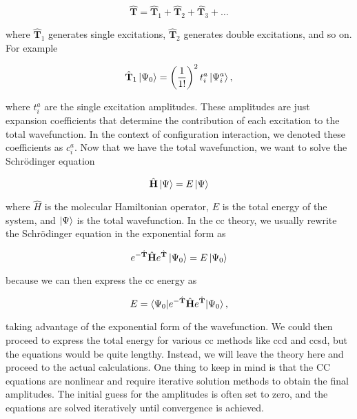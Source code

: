 \begin{equation}
\hat{\mathbf{T}}=\hat{\mathbf{T}}_1+\hat{\mathbf{T}}_2+\hat{\mathbf{T}}_3+\dots
\end{equation}

where \(\hat{\mathbf{T}}_1\) generates single excitations, \(\hat{\mathbf{T}}_2\) generates double excitations, and so on. For example

\begin{equation}
\hat{\mathbf{T}}_1\ket{\Psi_0}=\left(\frac{1}{1!}\right)^2t_i^a\ket{\Psi_i^a},
\end{equation}

where \(t_i^a\) are the single excitation amplitudes. These amplitudes are just expansion coefficients that determine the contribution of each excitation to the total wavefunction. In the context of configuration interaction, we denoted these coefficients as \(c_i^a\). Now that we have the total wavefunction, we want to solve the Schrödinger equation

\begin{equation}
\hat{\mathbf{H}}\ket{\Psi}=E\ket{\Psi}
\end{equation}

where \(\hat{H}\) is the molecular Hamiltonian operator, \(E\) is the total energy of the system, and \(\ket{\Psi}\) is the total wavefunction. In the \acrshort{cc} theory, we usually rewrite the Schrödinger equation in the exponential form as

\begin{equation}
e^{-\hat{\mathbf{T}}}\hat{\mathbf{H}}e^{\hat{\mathbf{T}}}\ket{\Psi_0}=E\ket{\Psi_0}
\end{equation}

because we can then express the \acrshort{cc} energy as

\begin{equation}
E=\braket{\Psi_0|e^{-\hat{\mathbf{T}}}\hat{\mathbf{H}}e^{\hat{\mathbf{T}}}|\Psi_0},
\end{equation}

taking advantage of the exponential form of the wavefunction. We could then proceed to express the total energy for various \acrshort{cc} methods like \acrshort{ccd} and \acrshort{ccsd}, but the equations would be quite lengthy. Instead, we will leave the theory here and proceed to the actual calculations. One thing to keep in mind is that the CC equations are nonlinear and require iterative solution methods to obtain the final amplitudes. The initial guess for the amplitudes is often set to zero, and the equations are solved iteratively until convergence is achieved.

